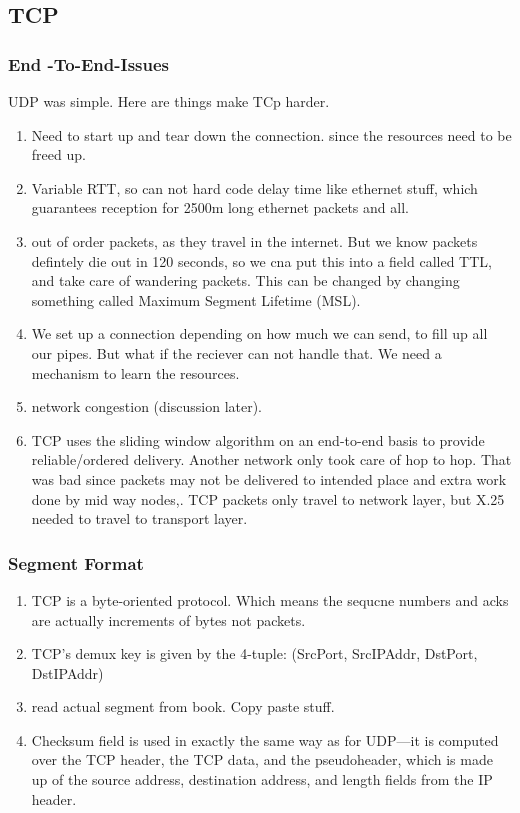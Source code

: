 \documentclass[11pt, a4paper]{article}
\begin{document}
\subsection{TCP}
\subsubsection{End -To-End-Issues}
UDP was simple. Here are things make TCp harder.
\begin{enumerate}
    \item Need to start up and tear down the connection. since the resources need to be freed up.
    \item Variable RTT, so can not hard code delay time like ethernet stuff, which guarantees reception for 2500m long ethernet packets and all.
    \item out of order packets, as they travel in the internet. But we know packets defintely die out in 120 seconds, so we cna put this into a field called TTL, and take care of wandering packets. This can be changed by changing something called Maximum Segment Lifetime (MSL).
    \item We set up a connection depending on how much we can send, to fill up all our pipes. But what if the reciever can not handle that. We need a mechanism to learn the resources.
    \item network congestion (discussion later).
    \item TCP uses the sliding window algorithm on an end-to-end basis to provide reliable/ordered delivery. Another network only took care of hop to hop. That was bad since packets may not be delivered to intended place and extra work done by mid way nodes,. TCP packets only travel to network layer, but X.25 needed to travel to transport layer.
\end{enumerate}

\subsubsection{Segment Format}
\begin{enumerate}
    \item TCP is a byte-oriented protocol. Which means the sequcne numbers and acks are actually increments of bytes not packets.
    \item TCP’s demux key is given by the 4-tuple: (SrcPort, SrcIPAddr, DstPort, DstIPAddr)
    \item read actual segment from book. Copy paste stuff.
    \item Checksum field is used in exactly the same way as for UDP—it is computed over the TCP header, the TCP data, and the pseudoheader, which is made up of the source address, destination address, and length fields from the IP header.
\end{enumerate}
\end{document}
